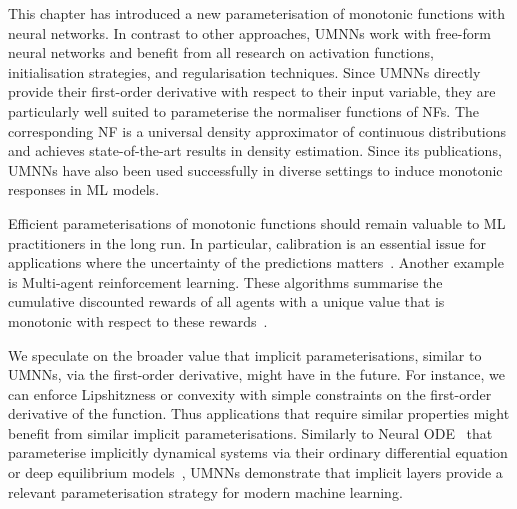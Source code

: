 This chapter has introduced a new parameterisation of monotonic functions with neural networks. In contrast to other approaches, UMNNs work with free-form neural networks and benefit from all research on activation functions, initialisation strategies, and regularisation techniques. Since UMNNs directly provide their first-order derivative with respect to their input variable, they are particularly well suited to parameterise the normaliser functions of NFs. The corresponding NF is a universal density approximator of continuous distributions and achieves state-of-the-art results in density estimation. Since its publications, UMNNs have also been used successfully in diverse settings to induce monotonic responses in ML models.

Efficient parameterisations of monotonic functions should remain valuable to ML practitioners in the long run. In particular, calibration is an essential issue for applications where the uncertainty of the predictions matters~\citep{minderer2021revisiting, guo2017calibration, cranmer2015approximating}. Another example is Multi-agent reinforcement learning. These algorithms summarise the cumulative discounted rewards of all agents with a unique value that is monotonic with respect to these rewards~\citep{rashid2018qmix, leroy2020qvmix}.

We speculate on the broader value that implicit parameterisations, similar to UMNNs, via the first-order derivative, might have in the future. For instance, we can enforce Lipshitzness or convexity with simple constraints on the first-order derivative of the function. Thus applications that require similar properties might benefit from similar implicit parameterisations. Similarly to Neural ODE~\citep{chen_neural_2018} that parameterise implicitly dynamical systems via their ordinary differential equation or deep equilibrium models~\citep{bai2019deep}, UMNNs demonstrate that implicit layers provide a relevant parameterisation strategy for modern machine learning.
